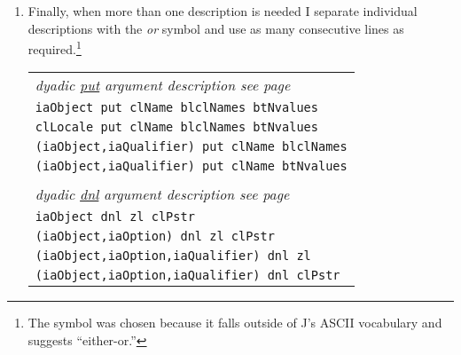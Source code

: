 \begin{enumerate}
\begin{center}
\begin{tabular}{ll}
\end{tabular} 
\end{center}
 \item Finally, when more than one description is needed I separate individual 
 descriptions with the \emph{or} symbol \argsep and use as many consecutive lines as required.\footnote{The \argsep symbol was chosen because it falls outside 
 of J's ASCII vocabulary and suggests ``either-or.''} 
  \begin{center}
 \footnotesize
\begin{tabular}{l}
 \textcolor{CodeComment}{\ttfamily\textsl{dyadic \hyperlink{il:put}{put} argument description see page~\pageref{ss:put}}} \\
 \texttt{iaObject put clName \argsep blclNames \argsep btNvalues} \\
 \texttt{clLocale put clName \argsep blclNames \argsep btNvalues} \\
 \texttt{(iaObject,iaQualifier) put clName \argsep blclNames}  \\
 \texttt{(iaObject,iaQualifier) put clName btNvalues} \\
 \\
  \textcolor{CodeComment}{\ttfamily\textsl{dyadic \hyperlink{il:dnl}{dnl} argument description see page~\pageref{ss:dnl}}} \\
 \texttt{iaObject dnl zl \argsep clPstr} \\
 \texttt{(iaObject,iaOption) dnl zl \argsep clPstr} \\
  \texttt{(iaObject,iaOption,iaQualifier) dnl zl } \\
  \texttt{(iaObject,iaOption,iaQualifier) dnl clPstr} \\
\end{tabular} 
\end{center}
\end{enumerate}